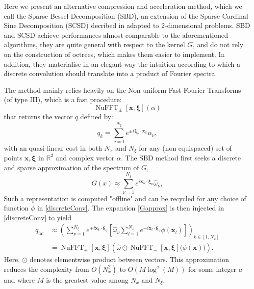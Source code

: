 \documentclass[11pt,a4paper]{article}
\begin{document}
Here we present an alternative compression and acceleration method, which we call the Sparse Bessel Decomposition (SBD), an extension of the Sparse Cardinal Sine Decomposition (SCSD) decribed in \cite{Alouges2015} adapted to 2-dimensional problems. SBD and SCSD achieve performances almost comparable to the aforementioned algorithms, they are quite general with respect to the kernel $G$, and do not rely on the construction of octrees, which makes them easier to implement. In addition, they materialise in an elegant way the intuition according to which a discrete convolution should translate into a product of Fourier spectra. 

The method mainly relies heavily on the Non-uniform Fast Fourier Transforms \cite{NuFFT} (of type III), which is a fast procedure:
\[\operatorname{NuFFT}_\pm[\boldsymbol{x},\boldsymbol{\xi}](\alpha)\]
that returns the vector $q$ defined by:
\[ q_k = \sum_{\nu = 1}^{N_{\xi}} e^{\pm i \boldsymbol{\xi}_\nu \cdot \boldsymbol{x}_k} \alpha_\nu ,\]
with an quasi-linear cost in both $N_x$ and $N_\xi$ for any (non equispaced) set of points $\boldsymbol{x},\boldsymbol{\xi}$ in $\mathbb{R}^2$ and complex vector $\alpha$.
The SBD method first seeks a discrete and sparse approximation of the spectrum of $G$,
\begin{equation}
	\label{Gapprox}
	G(x) \approx \sum_{\nu=1}^{N_\xi} e^{i  \boldsymbol{x}_k\cdot \boldsymbol{\xi}_\nu} \hat{\omega}_\nu ,
\end{equation}
Such a representation is computed "offline" and can be recycled for any choice of function $\phi$ in \eqref{discreteConv}. The expansion \eqref{Gapprox} is then injected in  \eqref{discreteConv} to yield 
\begin{equation}
	\begin{split}	q_{\text{far}} &\approx \left(\sum_{\nu = 1}^{N_\xi} e^{+i  \boldsymbol{x}_k  \cdot\boldsymbol{\xi}_\nu } \left[\hat{\omega}_\nu \sum_{l=1}^{N_x} e^{- i \boldsymbol{x}_l \cdot \boldsymbol{\xi}_\nu} \phi(\boldsymbol{x}_l) \right]\right)_{k \in [1,N_x]}\\
		&= \operatorname{NuFFT}_+[\boldsymbol{x},\boldsymbol{\xi}]\left(\hat{\omega} \odot \operatorname{NuFFT}_-[\boldsymbol{x},\boldsymbol{\xi}]\big(\phi(\boldsymbol{x})\big)\right).
	\end{split}
	\label{far convolution}					
\end{equation}
Here, $\odot$ denotes elementwise product between vectors. This approximation reduces the complexity from $O(N_x^2)$ to $O(M \log^a (M))$ for some integer $a$ and where $M$ is the greatest value among $N_x$ and $N_\xi$. 
\end{document}
